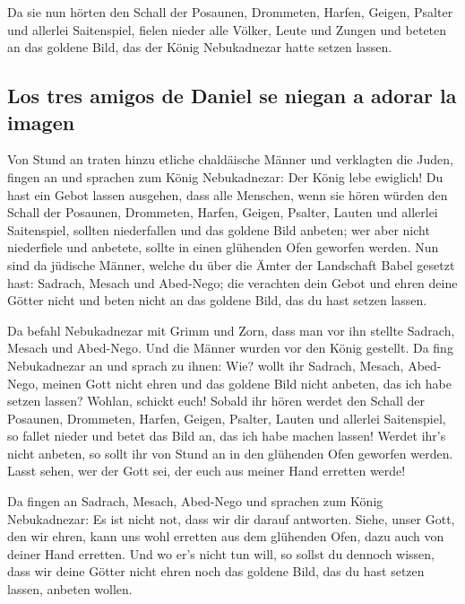  Da sie nun hörten den Schall der Posaunen, Drommeten,
Harfen, Geigen, Psalter und allerlei Saitenspiel, fielen nieder alle
Völker, Leute und Zungen und beteten an das goldene Bild, das der König
Nebukadnezar hatte setzen lassen.

\hypertarget{los-tres-amigos-de-daniel-se-niegan-a-adorar-la-imagen}{%
\subsection{Los tres amigos de Daniel se niegan a adorar la
imagen}\label{los-tres-amigos-de-daniel-se-niegan-a-adorar-la-imagen}}

 Von Stund an traten hinzu etliche chaldäische Männer und
verklagten die Juden,  fingen an und sprachen zum König
Nebukadnezar: Der König lebe ewiglich!  Du hast ein Gebot
lassen ausgehen, dass alle Menschen, wenn sie hören würden den Schall
der Posaunen, Drommeten, Harfen, Geigen, Psalter, Lauten und allerlei
Saitenspiel, sollten niederfallen und das goldene Bild anbeten;
 wer aber nicht niederfiele und anbetete, sollte in einen
glühenden Ofen geworfen werden.  Nun sind da jüdische
Männer, welche du über die Ämter der Landschaft Babel gesetzt hast:
Sadrach, Mesach und Abed-Nego; die verachten dein Gebot und ehren deine
Götter nicht und beten nicht an das goldene Bild, das du hast setzen
lassen.

 Da befahl Nebukadnezar mit Grimm und Zorn, dass man vor
ihn stellte Sadrach, Mesach und Abed-Nego. Und die Männer wurden vor den
König gestellt.  Da fing Nebukadnezar an und sprach zu
ihnen: Wie? wollt ihr Sadrach, Mesach, Abed-Nego, meinen Gott nicht
ehren und das goldene Bild nicht anbeten, das ich habe setzen lassen?
 Wohlan, schickt euch! Sobald ihr hören werdet den Schall
der Posaunen, Drommeten, Harfen, Geigen, Psalter, Lauten und allerlei
Saitenspiel, so fallet nieder und betet das Bild an, das ich habe machen
lassen! Werdet ihr's nicht anbeten, so sollt ihr von Stund an in den
glühenden Ofen geworfen werden. Lasst sehen, wer der Gott sei, der euch
aus meiner Hand erretten werde!

 Da fingen an Sadrach, Mesach, Abed-Nego und sprachen zum
König Nebukadnezar: Es ist nicht not, dass wir dir darauf antworten.
 Siehe, unser Gott, den wir ehren, kann uns wohl erretten
aus dem glühenden Ofen, dazu auch von deiner Hand erretten.
 Und wo er's nicht tun will, so sollst du dennoch wissen,
dass wir deine Götter nicht ehren noch das goldene Bild, das du hast
setzen lassen, anbeten wollen.

